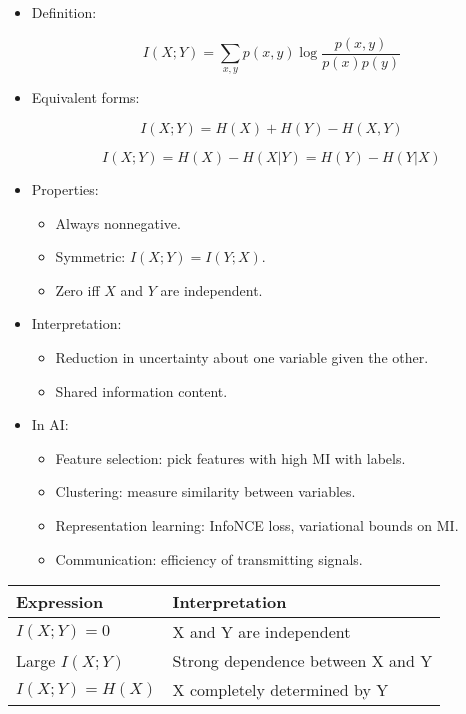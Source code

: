 \documentclass[
  letterpaper,
  DIV=11,
  numbers=noendperiod]{scrreprt}
\providecommand{\tightlist}{%
  \setlength{\itemsep}{0pt}\setlength{\parskip}{0pt}}
\begin{document}
\begin{itemize}
\item
  Definition:

  \[
  I(X;Y) = \sum_{x,y} p(x,y) \log \frac{p(x,y)}{p(x)p(y)}
  \]
\item
  Equivalent forms:

  \[
  I(X;Y) = H(X) + H(Y) - H(X,Y)
  \]

  \[
  I(X;Y) = H(X) - H(X|Y) = H(Y) - H(Y|X)
  \]
\item
  Properties:

  \begin{itemize}
  \tightlist
  \item
    Always nonnegative.
  \item
    Symmetric: \(I(X;Y) = I(Y;X)\).
  \item
    Zero iff \(X\) and \(Y\) are independent.
  \end{itemize}
\item
  Interpretation:

  \begin{itemize}
  \tightlist
  \item
    Reduction in uncertainty about one variable given the other.
  \item
    Shared information content.
  \end{itemize}
\item
  In AI:

  \begin{itemize}
  \tightlist
  \item
    Feature selection: pick features with high MI with labels.
  \item
    Clustering: measure similarity between variables.
  \item
    Representation learning: InfoNCE loss, variational bounds on MI.
  \item
    Communication: efficiency of transmitting signals.
  \end{itemize}
\end{itemize}

\begin{longtable}[]{@{}ll@{}}
\toprule\noalign{}
Expression & Interpretation \\
\midrule\noalign{}
\endhead
\bottomrule\noalign{}
\endlastfoot
\(I(X;Y)=0\) & X and Y are independent \\
Large \(I(X;Y)\) & Strong dependence between X and Y \\
\(I(X;Y)=H(X)\) & X completely determined by Y \\
\end{longtable}
\end{document}
